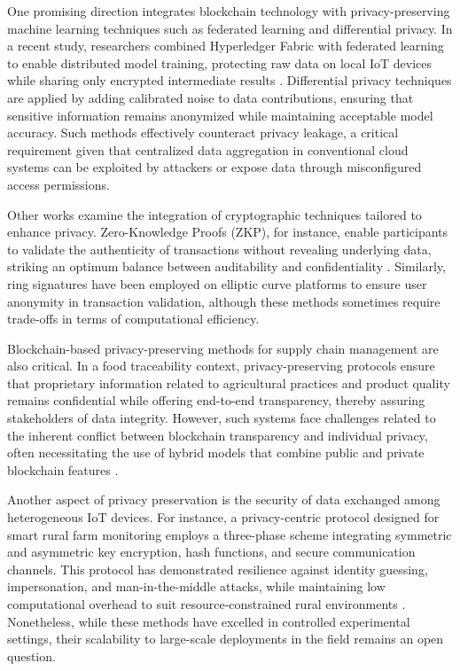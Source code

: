 \documentclass[12pt,onecolumn]{IEEEtran} %
\begin{document}
One promising direction integrates blockchain technology with privacy-preserving machine learning techniques such as federated learning and differential privacy. In a recent study, researchers combined Hyperledger Fabric with federated learning to enable distributed model training, protecting raw data on local IoT devices while sharing only encrypted intermediate results \cite{daund2025designofan}. Differential privacy techniques are applied by adding calibrated noise to data contributions, ensuring that sensitive information remains anonymized while maintaining acceptable model accuracy. Such methods effectively counteract privacy leakage, a critical requirement given that centralized data aggregation in conventional cloud systems can be exploited by attackers or expose data through misconfigured access permissions.

Other works examine the integration of cryptographic techniques tailored to enhance privacy. Zero-Knowledge Proofs (ZKP), for instance, enable participants to validate the authenticity of transactions without revealing underlying data, striking an optimum balance between auditability and confidentiality \cite{soy2025blockchainintegrationin}. Similarly, ring signatures have been employed on elliptic curve platforms to ensure user anonymity in transaction validation, although these methods sometimes require trade-offs in terms of computational efficiency.

Blockchain-based privacy-preserving methods for supply chain management are also critical. In a food traceability context, privacy-preserving protocols ensure that proprietary information related to agricultural practices and product quality remains confidential while offering end-to-end transparency, thereby assuring stakeholders of data integrity. However, such systems face challenges related to the inherent conflict between blockchain transparency and individual privacy, often necessitating the use of hybrid models that combine public and private blockchain features \cite{soy2025blockchainintegrationin}.

Another aspect of privacy preservation is the security of data exchanged among heterogeneous IoT devices. For instance, a privacy-centric protocol designed for smart rural farm monitoring employs a three-phase scheme integrating symmetric and asymmetric key encryption, hash functions, and secure communication channels. This protocol has demonstrated resilience against identity guessing, impersonation, and man-in-the-middle attacks, while maintaining low computational overhead to suit resource-constrained rural environments \cite{rahaman2024privacycentricaiand}. Nonetheless, while these methods have excelled in controlled experimental settings, their scalability to large-scale deployments in the field remains an open question.
\end{document}
